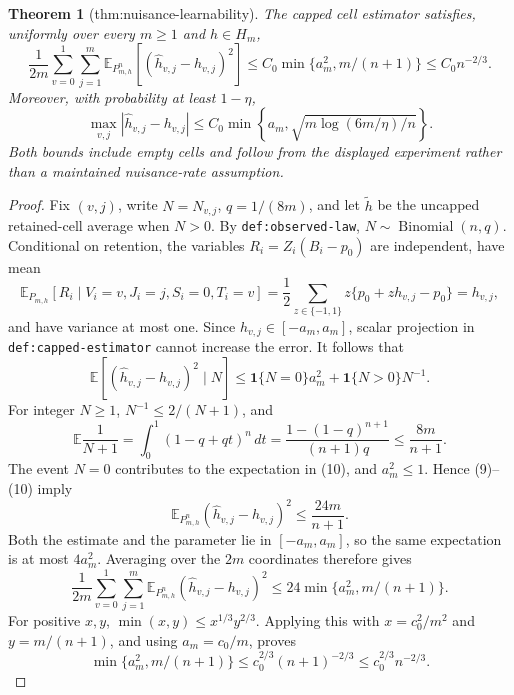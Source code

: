 \documentclass{article}
\newtheorem{theorem}{Theorem}
\begin{document}
\begin{theorem}[thm:nuisance-learnability]\label{thm:nuisance-learnability}
The capped cell estimator satisfies, uniformly over every \(m\ge1\) and \(h\in H_m\), \[\frac1{2m}\sum_{v=0}^{1}\sum_{j=1}^{m}\mathbb E_{P_{m,h}^{n}}[(\widehat h_{v,j}-h_{v,j})^2]\le C_0\min\{a_m^2,m/(n+1)\}\le C_0n^{-2/3}.\] Moreover, with probability at least \(1-\eta\), \[\max_{v,j}|\widehat h_{v,j}-h_{v,j}|\le C_0\min\left\{a_m,\sqrt{m\log(6m/\eta)/n}\right\}.\] Both bounds include empty cells and follow from the displayed experiment rather than a maintained nuisance-rate assumption.
\end{theorem}
\begin{proof}
Fix \((v,j)\), write \(N=N_{v,j}\), \(q=1/(8m)\), and let
\(\widetilde h\) be the uncapped retained-cell average when \(N>0\).
By \texttt{def:observed-law}, \(N\sim\operatorname{Binomial}(n,q)\).
Conditional on retention, the variables \(R_i=Z_i(B_i-p_0)\) are independent,
have mean
\[
 \mathbb E_{P_{m,h}}[R_i\mid V_i=v,J_i=j,S_i=0,T_i=v]
 =\frac12\sum_{z\in\{-1,1\}}z\{p_0+zh_{v,j}-p_0\}=h_{v,j},             \tag{8}
\]
and have variance at most one.  Since \(h_{v,j}\in[-a_m,a_m]\), scalar
projection in \texttt{def:capped-estimator} cannot increase the error.
It follows that
\[
 \mathbb E[(\widehat h_{v,j}-h_{v,j})^2\mid N]
 \le \mathbf1\{N=0\}a_m^2+\mathbf1\{N>0\}N^{-1}.                      \tag{9}
\]
For integer \(N\ge1\), \(N^{-1}\le2/(N+1)\), and
\[
 \mathbb E\frac1{N+1}
 =\int_0^1(1-q+qt)^n\,dt
 =\frac{1-(1-q)^{n+1}}{(n+1)q}
 \le\frac{8m}{n+1}.                                                     \tag{10}
\]
The event \(N=0\) contributes to the expectation in (10), and
\(a_m^2\le1\).  Hence (9)--(10) imply
\[
 \mathbb E_{P_{m,h}^n}(\widehat h_{v,j}-h_{v,j})^2
 \le\frac{24m}{n+1}.                                                     \tag{11}
\]
Both the estimate and the parameter lie in \([-a_m,a_m]\), so the same
expectation is at most \(4a_m^2\).  Averaging over the \(2m\) coordinates
therefore gives
\[
 \frac1{2m}\sum_{v=0}^1\sum_{j=1}^m
 \mathbb E_{P_{m,h}^n}(\widehat h_{v,j}-h_{v,j})^2
 \le24\min\{a_m^2,m/(n+1)\}.                                          \tag{12}
\]
For positive \(x,y\), \(\min(x,y)\le x^{1/3}y^{2/3}\).  Applying this
with \(x=c_0^2/m^2\) and \(y=m/(n+1)\), and using \(a_m=c_0/m\), proves
\[
 \min\{a_m^2,m/(n+1)\}
 \le c_0^{2/3}(n+1)^{-2/3}\le c_0^{2/3}n^{-2/3}.                        \tag{13}
\]


\end{proof}
\end{document}
